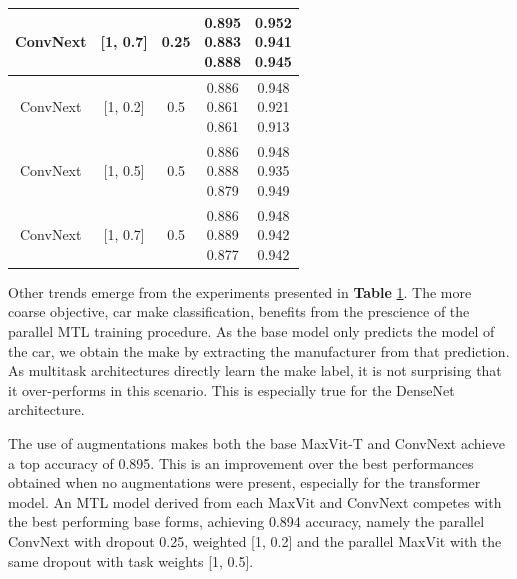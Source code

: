 \documentclass[conference]{IEEEtran}
\begin{document}
\begin{table}[ht]
{\begin{tabular}{||c c c c c||}
     \hline
     ConvNext & [1, 0.7] & 0.25 & \multilinecell{\textbf{0.895}\\ 0.883 \\ 0.888 } & \multilinecell{0.952 \\0.941\\ 0.945}\\ 
     \hline
     ConvNext & [1, 0.2] & 0.5 &  \multilinecell{0.886 \\0.861 \\ 0.861} &  \multilinecell{0.948 \\0.921 \\ 0.913} \\ 
     \hline
     ConvNext & [1, 0.5] & 0.5&  \multilinecell{0.886 \\ 0.888 \\ 0.879 } & \multilinecell{0.948 \\0.935 \\ 0.949}\\
     \hline
     ConvNext & [1, 0.7] & 0.5 & \multilinecell{0.886 \\ 0.889 \\ 0.877 } & \multilinecell{0.948 \\0.942 \\ 0.942}\\ 
     \hline \hline  
    \end{tabular}}
    \label{tab:experiment3}
\end{table}

Other trends emerge from the experiments presented in \textbf{Table} \ref{tab:experiment3}. The more coarse objective, car make classification, benefits from the prescience of the parallel MTL training procedure. As the base model only predicts the model of the car, we obtain the make by extracting the manufacturer from that prediction. As multitask architectures directly learn the make label, it is not surprising that it over-performs in this scenario. This is especially true for the DenseNet architecture. 

The use of augmentations makes both the base MaxVit-T and ConvNext achieve a top accuracy of 0.895. This is an improvement over the best performances obtained when no augmentations were present, especially for the transformer model. An MTL model derived from each MaxVit and ConvNext competes with the best performing base forms, achieving 0.894 accuracy, namely the parallel ConvNext with dropout 0.25, weighted [1, 0.2] and the parallel MaxVit with the same dropout with task weights [1, 0.5].
\end{document}
